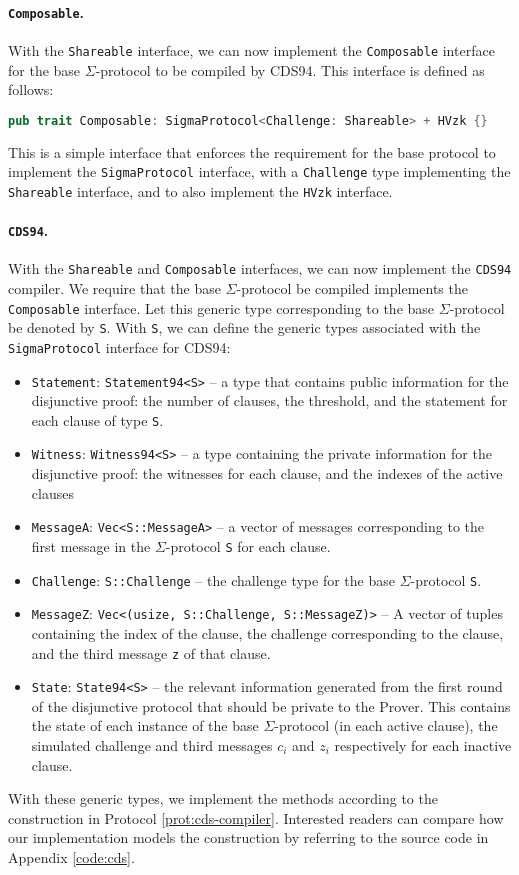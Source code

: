 \paragraph{\texttt{Composable}.} With the \texttt{Shareable} interface, we can now implement the \texttt{Composable}
interface for the base $\Sigma$-protocol to be compiled by CDS94. This interface is defined as follows:

\begin{lstlisting}[language=rust]
  pub trait Composable: SigmaProtocol<Challenge: Shareable> + HVzk {}
\end{lstlisting}

This is a simple interface that enforces the requirement for the base protocol to implement 
the \texttt{SigmaProtocol} interface, with a \texttt{Challenge} type implementing the \texttt{Shareable} 
interface, and to also implement the \texttt{HVzk} interface.

\paragraph{\texttt{CDS94}.} With the \texttt{Shareable} and \texttt{Composable} interfaces, we can now implement
the \texttt{CDS94} compiler. We require that the base $\Sigma$-protocol be compiled implements the
\texttt{Composable} interface. Let this generic type corresponding to the base $\Sigma$-protocol be 
denoted by \texttt{S}. With \texttt{S}, we can define the generic types associated with the \texttt{SigmaProtocol} interface 
for CDS94:

\begin{itemize}
  \item \texttt{Statement}: \texttt{Statement94<S>} -- a type that contains public information 
  for the disjunctive proof: the number of clauses, the threshold, and the statement for each 
  clause of type \texttt{S}.
  \item \texttt{Witness}: \texttt{Witness94<S>} -- a type containing the private information for the 
  disjunctive proof: the witnesses for each clause, and the indexes of the active clauses 
  \item \texttt{MessageA}: \texttt{Vec<S::MessageA>} -- a vector of messages corresponding to the 
  first message in the $\Sigma$-protocol \texttt{S} for each clause.
  \item \texttt{Challenge}: \texttt{S::Challenge} -- the challenge type for the base $\Sigma$-protocol \texttt{S}.
  \item \texttt{MessageZ}: \texttt{Vec<(usize, S::Challenge, S::MessageZ)>} -- A vector of tuples containing 
  the index of the clause, the challenge corresponding to the clause, and the third message \texttt{z} 
  of that clause.
  \item \texttt{State}: \texttt{State94<S>} -- the relevant information generated from the first round
  of the disjunctive protocol that should be private to the Prover. This 
  contains the state of each instance of the base $\Sigma$-protocol (in each active clause), 
  the simulated challenge and 
  third messages $c_i$ and $z_i$ respectively for each inactive clause. 
\end{itemize}

With these generic types, we implement the methods according to the construction in Protocol \ref{prot:cds-compiler}.
Interested readers can compare how our implementation models the construction by referring to the source code 
in Appendix \ref{code:cds}.
